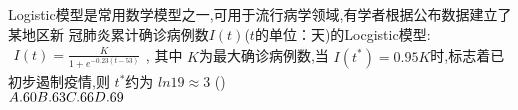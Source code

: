 \documentclass[class=ctexart,crop=false]{standalone}
\begin{document}
Logistic模型是常用数学模型之一,可用于流行病学领域,有学者根据公布数据建立了某地区新
冠肺炎累计确诊病例数$I(t)$($t$的单位：天)的Locgistic模型:$\begin{aligned}
    I(t)=\frac{K}{1+e^{-0.23(t-53)}}
\end{aligned}$,
其中 $K$为最大确诊病例数,当 $I(t^*)=0.95K$时,标志着已初步遏制疫情,则 $t^*$约为 $ln19\approx 3$
\hfill (\qquad)\\
    $A. 60\hfill B. 63\hfill C. 66\hfill D. 69\hfill$
\end{document}
